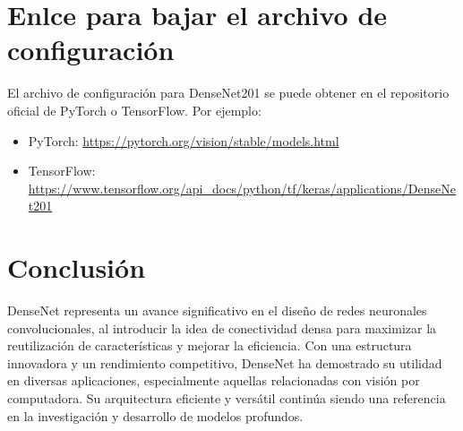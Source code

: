 \documentclass{article}
\begin{document}
\section{Enlce para bajar el archivo de configuración}

El archivo de configuración para DenseNet201 se puede obtener en el repositorio oficial de PyTorch o TensorFlow. Por ejemplo:
\begin{itemize}
    \item PyTorch: \url{https://pytorch.org/vision/stable/models.html}
    \item TensorFlow: \url{https://www.tensorflow.org/api_docs/python/tf/keras/applications/DenseNet201}
\end{itemize}


\section{Conclusión}
DenseNet representa un avance significativo en el diseño de redes neuronales convolucionales, al introducir la idea de conectividad densa para maximizar la 
reutilización de características y mejorar la eficiencia. Con una estructura innovadora y un rendimiento competitivo, DenseNet ha demostrado su utilidad en 
diversas aplicaciones, especialmente aquellas relacionadas con visión por computadora. Su arquitectura eficiente y versátil continúa siendo una referencia en
 la investigación y desarrollo de modelos profundos.



\end{document}
